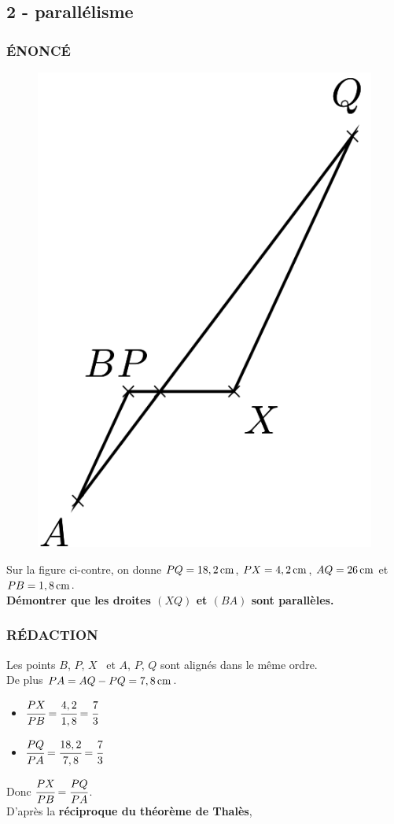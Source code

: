 \documentclass[11pt]{article}
\begin{document}
\subsection*{2 - parallélisme}

\begin{multicols}{2}

  \subsubsection*{ÉNONCÉ}

  \begin{figure}[H]
    \centering
    \includegraphics[width=0.4\linewidth]{3x6-thales/sources/thales-2.png}
  \end{figure}

  Sur la figure ci-contre, on donne $PQ=\unit[18,2]{cm}$, $PX=\unit[4,2]{cm}$, $AQ=\unit[26]{cm}$ et $PB=\unit[1,8]{cm}$.\\
  \textbf{Démontrer que les droites $(XQ)$ et $(BA)$ sont parallèles.}
  \columnbreak
    
  \subsubsection*{RÉDACTION}
    Les points $B$, $P$, $X$~ et $A$, $P$, $Q$ sont alignés dans le même ordre. \\
    De plus $PA=AQ-PQ=\unit[7,8]{cm}$.

    \begin{itemize}
      \item $\cfrac{PX}{PB}=\cfrac{4,2}{1,8}=\cfrac{7}{3}$
      \item $\cfrac{PQ}{PA}=\cfrac{18,2}{7,8}=\cfrac{7}{3}$ \\
    \end{itemize}

    Donc $\cfrac{PX}{PB}=\cfrac{PQ}{PA}$.\\

    D'après la \textbf{réciproque du théorème de Thalès}, 
\end{multicols}
\end{document}
